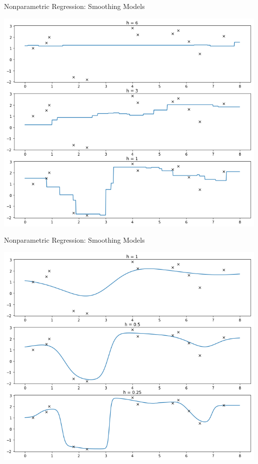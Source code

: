 \documentclass{beamer}
\begin{document}
\begin{frame}[fragile]{Nonparametric Regression: Smoothing Models}
  \begin{center}
    \includegraphics[height=0.9\textheight]{images/running_mean_smoother.png}
  \end{center}
\end{frame}

\begin{frame}[fragile]{Nonparametric Regression: Smoothing Models}
  \begin{center}
    \includegraphics[height=0.9\textheight]{images/kernel_smoother.png}
  \end{center}
\end{frame}
\end{document}
